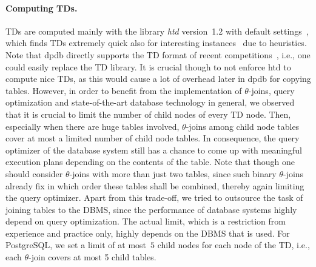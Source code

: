 \documentclass{llncs}
\newcommand{\dpdb}{{\small\textsf{dpdb}}\xspace}
\begin{document}
\paragraph*{Computing TDs.}
TDs are computed mainly with the library \emph{htd} version~1.2 with default
settings~\cite{AbseherMusliuWoltran17a}, %
which finds TDs extremely quick
also for interesting instances~\cite{FichteHecherZisser19} due to heuristics.
Note that \dpdb directly supports the TD format of recent competitions~\cite{DellHusfeldtJansen17a,DellKomusiewiczTalmon18a},
i.e., one could easily replace the TD library.
It is crucial though to not enforce htd to compute nice TDs, as this would cause a lot of overhead later in \dpdb for copying tables.
However, in order to benefit from the implementation of $\theta$-joins,
query optimization and state-of-the-art database technology in general, 
we observed that it is crucial to limit the number of child nodes of every TD node.
Then, especially when there are huge tables involved, $\theta$-joins among child node tables
cover at most a limited number of child node tables.
In consequence, the query optimizer of the database system still has a chance
to come up with meaningful execution plans depending on the contents of the table.
Note that though one should consider $\theta$-joins with more than just two tables,
since such binary $\theta$-joins already fix in which order these tables shall be combined,
thereby again limiting the query optimizer. %
Apart from this trade-off, we tried to outsource the task of joining tables to the DBMS, %
since the performance of database systems highly depend on query optimization. %
The actual limit, which is a restriction from experience and practice only, highly depends on the DBMS that is used.
For PostgreSQL, we set a limit of at most~$5$ child nodes for each node of the TD,
i.e., each $\theta$-join covers at most 5 child tables.
\end{document}
